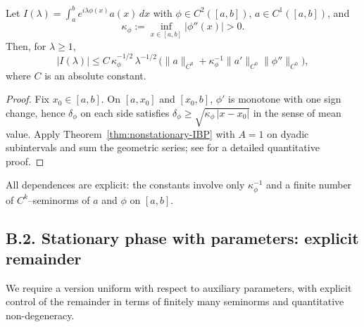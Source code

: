 \begin{corollary}[Quantified van der Corput, $k=2$]
\label{cor:vdC-k2}
Let $I(\lambda)=\int_{a}^{b} e^{i\lambda \phi(x)} a(x)\,dx$ with $\phi\in C^2([a,b])$, $a\in C^1([a,b])$, and
\[
\kappa_\phi := \inf_{x\in[a,b]} |\phi''(x)| > 0.
\]
Then, for $\lambda\ge1$,
\[
|I(\lambda)| \le C\, \kappa_\phi^{-1/2}\, \lambda^{-1/2}\,
\Big( \|a\|_{C^{0}} + \kappa_\phi^{-1}\|a'\|_{C^{0}}\|\phi''\|_{C^{0}} \Big),
\]
where $C$ is an absolute constant.
\end{corollary}

\begin{proof}
Fix $x_0\in[a,b]$. On $[a,x_0]$ and $[x_0,b]$, $\phi'$ is monotone with one sign change, hence $\delta_\phi$ on each side satisfies $\delta_\phi \ge \sqrt{\kappa_\phi \, |x-x_0|}$ in the sense of mean value. Apply Theorem~\ref{thm:nonstationary-IBP} with $A=1$ on dyadic subintervals and sum the geometric series; see \cite[Thm.~VIII.1.2]{SteinHA} for a detailed quantitative proof.
\end{proof}

\begin{remark}
All dependences are explicit: the constants involve only $\kappa_\phi^{-1}$ and a finite number of $C^k$–seminorms of $a$ and $\phi$ on $[a,b]$.
\end{remark}

\subsection*{B.2. Stationary phase with parameters: explicit remainder}
\label{appB:stat-phase-params}

We require a version uniform with respect to auxiliary parameters, with explicit control of the remainder in terms of finitely many seminorms and quantitative non-degeneracy.

